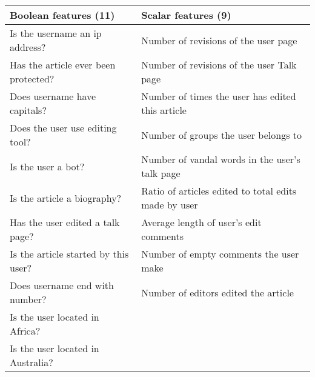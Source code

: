 \begin{tabular}{l||l}\hline
\textbf{Boolean features (11)} & \textbf{Scalar features (9)}\\
\hline
Is the username an ip address? & Number of revisions of the user page \\
Has the article ever been protected? & Number of revisions of the user Talk page \\
Does username have capitals? & Number of times the user has edited this article \\
Does the user use editing tool? & Number of groups the user belongs to \\
Is the user a bot? & Number of vandal words in the user's talk page \\
Is the article a biography? & Ratio of articles edited to total edits made by user \\
Has the user edited a talk page? & Average length of user’s edit comments \\
Is the article started by this user? & Number of empty comments the user make \\
Does username end with number? & Number of editors edited the article \\
Is the user located in Africa? & \\
Is the user located in Australia? & \\	 
\hline
\end{tabular}
